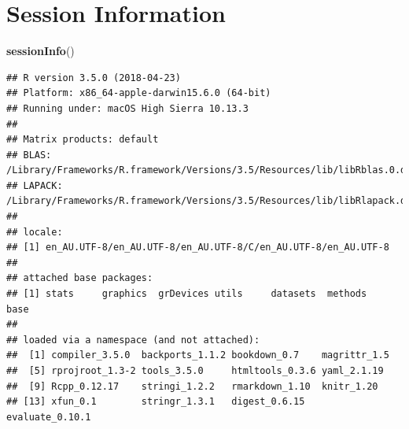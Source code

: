 \documentclass[]{book}
\newenvironment{Shaded}{\begin{snugshade}}{\end{snugshade}}
\newcommand{\KeywordTok}[1]{\textcolor[rgb]{0.13,0.29,0.53}{\textbf{#1}}}
\newcommand{\NormalTok}[1]{#1}
\theoremstyle{definition}
\theoremstyle{definition}
\theoremstyle{definition}
\theoremstyle{remark}
\begin{document}
\chapter{Session Information}\label{session-information}

\begin{Shaded}
\begin{Highlighting}[]
\KeywordTok{sessionInfo}\NormalTok{()}
\end{Highlighting}
\end{Shaded}

\begin{verbatim}
## R version 3.5.0 (2018-04-23)
## Platform: x86_64-apple-darwin15.6.0 (64-bit)
## Running under: macOS High Sierra 10.13.3
## 
## Matrix products: default
## BLAS: /Library/Frameworks/R.framework/Versions/3.5/Resources/lib/libRblas.0.dylib
## LAPACK: /Library/Frameworks/R.framework/Versions/3.5/Resources/lib/libRlapack.dylib
## 
## locale:
## [1] en_AU.UTF-8/en_AU.UTF-8/en_AU.UTF-8/C/en_AU.UTF-8/en_AU.UTF-8
## 
## attached base packages:
## [1] stats     graphics  grDevices utils     datasets  methods   base     
## 
## loaded via a namespace (and not attached):
##  [1] compiler_3.5.0  backports_1.1.2 bookdown_0.7    magrittr_1.5   
##  [5] rprojroot_1.3-2 tools_3.5.0     htmltools_0.3.6 yaml_2.1.19    
##  [9] Rcpp_0.12.17    stringi_1.2.2   rmarkdown_1.10  knitr_1.20     
## [13] xfun_0.1        stringr_1.3.1   digest_0.6.15   evaluate_0.10.1
\end{verbatim}


\end{document}
